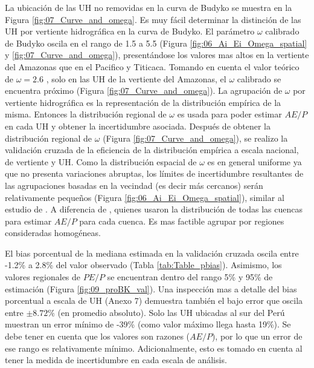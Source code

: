 \documentclass[12pt]{article}
\begin{document}


La ubicación de las UH no removidas en la curva de Budyko se muestra en la Figura \ref{fig:07_Curve_and_omega}. Es muy fácil determinar la distinción de las UH por vertiente hidrográfica en la curva de Budyko. El parámetro $\omega$ calibrado de Budyko oscila en el rango de 1.5 a 5.5 (Figura \ref{fig:06_Ai_Ei_Omega_spatial} y \ref{fig:07_Curve_and_omega}), presentándose los valores mas altos en la vertiente del Amazonas que en el Pacifico y Titicaca. Tomando en cuenta el valor teórico de $\omega = 2.6$ \citep{Fu1981}, solo en las UH de la vertiente del Amazonas, el $\omega$ calibrado se encuentra próximo (Figura \ref{fig:07_Curve_and_omega}). La agrupación de $\omega$ por vertiente hidrográfica es la representación de la distribución empírica de la misma. Entonces la distribución regional de $\omega$ es usada para poder estimar $AE/P$ en cada UH y obtener la incertidumbre asociada.
\clearpage
Después de obtener la distribución regional de $\omega$ (Figura \ref{fig:07_Curve_and_omega}), se realizo la validación cruzada de la eficiencia de la distribución empírica a escala nacional, de vertiente y UH. Como la distribución espacial de $\omega$ es en general uniforme ya que no presenta variaciones abruptas, los límites de incertidumbre resultantes de las agrupaciones basadas en la vecindad (es decir más cercanos) serán relativamente pequeños (Figura \ref{fig:06_Ai_Ei_Omega_spatial}), similar al estudio de \citet{Singh2015}. A diferencia de \citet{Greve2015}, quienes usaron la distribución de todas las cuencas para estimar $AE/P$ para cada cuenca. Es mas factible agrupar por regiones consideradas homogéneas.



El bias porcentual de la mediana estimada en la validación cruzada oscila entre -1.2\% a 2.8\% del valor observado (Tabla \ref{tab:Table_pbias}). Asimismo, los valores regionales de $PE/P$ se encuentran dentro del rango 5\% y 95\% de estimación (Figura \ref{fig:09_proBK_val}). Una inspección mas a detalle del bias porcentual a escala de UH (Anexo 7) demuestra también el bajo error que oscila entre $\pm8.72\%$ (en promedio absoluto). Solo las UH ubicadas al sur del Perú muestran un error mínimo de -39\% (como valor máximo llega hasta 19\%). Se debe tener en cuenta que los valores son razones ($AE/P$), por lo que un error de ese rango es relativamente mínimo. Adicionalmente, esto es tomado en cuenta al tener la medida de incertidumbre en cada escala de análisis.
\end{document}
